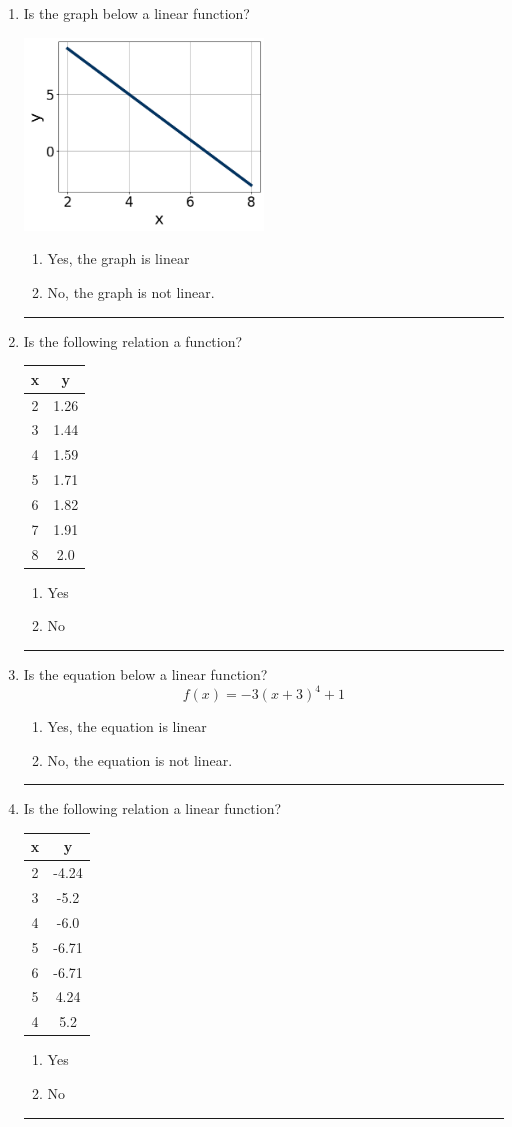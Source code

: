 \documentclass[14pt]{extbook}
\newcommand{\litem}[1]{\item#1\hspace*{-1cm}\rule{\textwidth}{0.4pt}}
\begin{document}
\begin{enumerate}
\litem{
Is the graph below a linear function?
\begin{center}
    \includegraphics[width=0.5\textwidth]{../Figures/MA_8_F_1_2_graphQ.png}
\end{center}
\begin{enumerate}[label=\Alph*.]
\item Yes, the graph is linear
\item No, the graph is not linear.

\end{enumerate} }
\litem{
Is the following relation a function?

\begin{tabular}{c|c}
x &y\tabularnewline \hline
2 &1.26\tabularnewline \hline
3 &1.44\tabularnewline \hline
4 &1.59\tabularnewline \hline
5 &1.71\tabularnewline \hline
6 &1.82\tabularnewline \hline
7 &1.91\tabularnewline \hline
8 &2.0\end{tabular}\begin{enumerate}[label=\Alph*.]
\item Yes
\item No

\end{enumerate} }
\litem{
Is the equation below a linear function?\[ f(x) = -3(x + 3)^4+1 \]\begin{enumerate}[label=\Alph*.]
\item Yes, the equation is linear
\item No, the equation is not linear.

\end{enumerate} }
\litem{
Is the following relation a linear function?

\begin{tabular}{c|c}
x &y\tabularnewline \hline
2 &-4.24\tabularnewline \hline
3 &-5.2\tabularnewline \hline
4 &-6.0\tabularnewline \hline
5 &-6.71\tabularnewline \hline
6 &-6.71\tabularnewline \hline
5 &4.24\tabularnewline \hline
4 &5.2\end{tabular}\begin{enumerate}[label=\Alph*.]
\item Yes
\item No

\end{enumerate} }
\end{enumerate}
\end{document}
